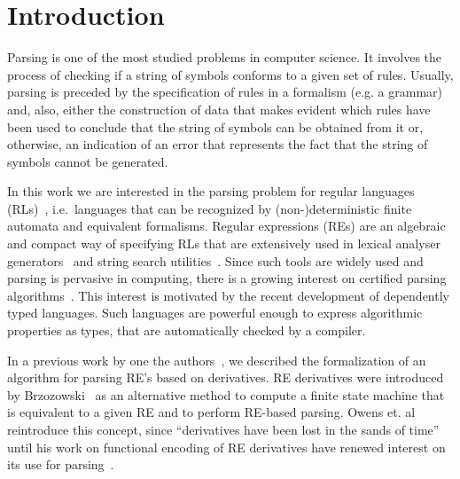\documentclass[sigplan, anonymous, review]{acmart}
\theoremstyle{definition}
\begin{document}



\maketitle

\section{Introduction}\label{sec:intro}

Parsing is one of the most studied problems in computer science. 
It involves the process of checking if a string of symbols conforms to
a given set of rules. Usually, parsing is preceded by the 
specification of rules in a formalism (e.g. a grammar) and, also, either the
construction of data that makes evident which rules have been used to
conclude that the string of symbols can be obtained from it or, otherwise,
an indication of an error that represents the
fact that the string of symbols cannot be generated.

In this work we are interested in the parsing problem for regular
languages (RLs)~\cite{Hopcroft2000}, i.e.~languages that can be
recognized by (non-)deterministic finite automata and equivalent
formalisms. Regular expressions (REs) are an algebraic and compact way
of specifying RLs that are extensively used in lexical analyser
generators~\cite{Lesk1990} and string search utilities~\cite{Grep}.
Since such tools are widely used and parsing is pervasive in
computing, there is a growing interest on certified parsing
algorithms~\cite{FirsovU13,FirsovU14,Danielsson2010}.  
This interest is motivated by the recent development of dependently typed
languages. Such languages are powerful enough to express algorithmic
properties as types, that are automatically checked by a compiler.

In a previous work by one the authors~\cite{Lopes2016}, we described
the formalization of an algorithm for parsing RE's based on 
derivatives. RE derivatives were introduced by
Brzozowski~\cite{Brzozowski1964} as an alternative method to compute a
finite state machine that is equivalent to a given RE and to perform
RE-based parsing. Owens et. al~\cite{Owens2009} reintroduce this concept,
since ``derivatives have been lost in the sands of time'' until his work on
functional encoding of RE derivatives have renewed interest on its use
for parsing~\cite{Might2011,Fischer2010}. 
\end{document}
